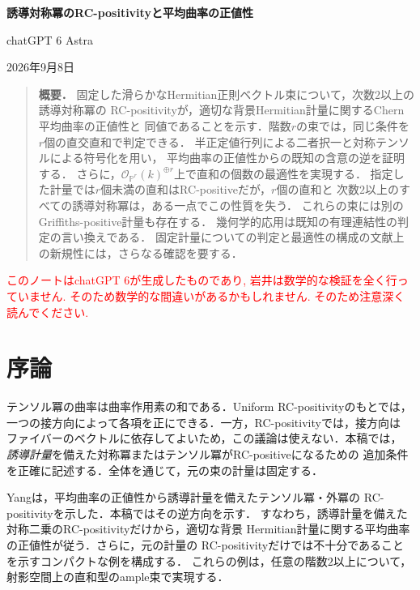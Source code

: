 \documentclass[12pt]{amsart}
\theoremstyle{definition}
\theoremstyle{remark}
\numberwithin{equation}{section}
\newcommand{\xr}[1]{\textcolor{red}{#1}}
\theoremstyle{definition}
\begin{document}
\newpage
\setcounter{section}{0}
\setcounter{equation}{0}
\setcounter{thm}{0}
\renewcommand{\theHsection}{ja.\arabic{section}}
\renewcommand{\proofname}{証明}
\renewcommand{\refname}{参考文献}
\let\thm\jthm\let\endthm\endjthm
\let\lem\jlem\let\endlem\endjlem
\let\cor\jcor\let\endcor\endjcor
{}
\thispagestyle{plain}
\begin{center}
{\large\bfseries 誘導対称冪のRC-positivityと平均曲率の正値性\par}
\medskip
chatGPT 6 Astra\par
\smallskip
2026年9月8日
\end{center}
\begin{quote}\small
\textbf{概要．}
固定した滑らかなHermitian正則ベクトル束について，次数$2$以上の誘導対称冪の
RC-positivityが，適切な背景Hermitian計量に関するChern平均曲率の正値性と
同値であることを示す．階数$r$の束では，同じ条件を$r$個の直交直和で判定できる．
半正定値行列による二者択一と対称テンソルによる符号化を用い，
平均曲率の正値性からの既知の含意の逆を証明する．
さらに，$\mathcal O_{\mathbb P^r}(k)^{\oplus r}$上で直和の個数の最適性を実現する．
指定した計量では$r$個未満の直和はRC-positiveだが，$r$個の直和と
次数$2$以上のすべての誘導対称冪は，ある一点でこの性質を失う．
これらの束には別のGriffiths-positive計量も存在する．
幾何学的応用は既知の有理連結性の判定の言い換えである．
固定計量についての判定と最適性の構成の文献上の新規性には，さらなる確認を要する．
\end{quote}
\xr{このノートはchatGPT 6が生成したものであり, 岩井は数学的な検証を全く行っていません. そのため数学的な間違いがあるかもしれません. そのため注意深く読んでください.}

\section{序論}

テンソル冪の曲率は曲率作用素の和である．Uniform RC-positivityのもとでは，
一つの接方向によって各項を正にできる．一方，RC-positivityでは，接方向は
ファイバーのベクトルに依存してよいため，この議論は使えない．本稿では，
\emph{誘導計量}を備えた対称冪またはテンソル冪がRC-positiveになるための
追加条件を正確に記述する．全体を通じて，元の束の計量は固定する．

Yangは，平均曲率の正値性から誘導計量を備えたテンソル冪・外冪の
RC-positivityを示した\cite[Theorem 3.6]{ja:Yan18}．本稿ではその逆方向を示す．
すなわち，誘導計量を備えた対称二乗のRC-positivityだけから，適切な背景
Hermitian計量に関する平均曲率の正値性が従う．さらに，元の計量の
RC-positivityだけでは不十分であることを示すコンパクトな例を構成する．
これらの例は，任意の階数$2$以上について，射影空間上の直和型のample束で実現する．
\end{document}

